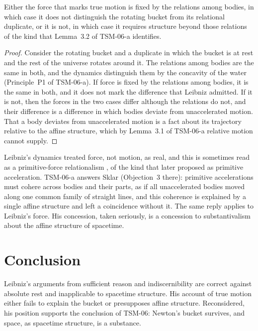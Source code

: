 \documentclass{situationist-preprint}
\begin{document}
\begin{proposition}\label{p:dilemma}
Either the force that marks true motion is fixed by the relations among bodies, in which case it does not distinguish the rotating bucket from its relational duplicate, or it is not, in which case it requires structure beyond those relations of the kind that Lemma~3.2 of TSM-06-a identifies.
\end{proposition}

\begin{proof}
Consider the rotating bucket and a duplicate in which the bucket is at rest and the rest of the universe rotates around it. The relations among bodies are the same in both, and the dynamics distinguish them by the concavity of the water (Principle~P1 of TSM-06-a). If force is fixed by the relations among bodies, it is the same in both, and it does not mark the difference that Leibniz admitted. If it is not, then the forces in the two cases differ although the relations do not, and their difference is a difference in which bodies deviate from unaccelerated motion. That a body deviates from unaccelerated motion is a fact about its trajectory relative to the affine structure, which by Lemma~3.1 of TSM-06-a relative motion cannot supply.
\end{proof}

Leibniz's dynamics treated force, not motion, as real, and this is sometimes read as a primitive-force relationalism \citep{Roberts2003}, of the kind that \citet{Sklar1974} later proposed as primitive acceleration. TSM-06-a answers Sklar (Objection~3 there): primitive accelerations must cohere across bodies and their parts, as if all unaccelerated bodies moved along one common family of straight lines, and this coherence is explained by a single affine structure and left a coincidence without it. The same reply applies to Leibniz's force. His concession, taken seriously, is a concession to substantivalism about the affine structure of spacetime.

\section{Conclusion}

Leibniz's arguments from sufficient reason and indiscernibility are correct against absolute rest and inapplicable to spacetime structure. His account of true motion either fails to explain the bucket or presupposes affine structure. Reconsidered, his position supports the conclusion of TSM-06: Newton's bucket survives, and space, as spacetime structure, is a substance.
\end{document}
